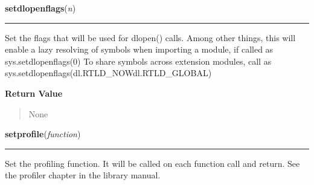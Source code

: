     \label{sys:setdlopenflags}

    \vspace{0.5ex}

\hspace{.8\funcindent}\begin{boxedminipage}{\funcwidth}

    \raggedright \textbf{setdlopenflags}(\textit{n})

    \vspace{-1.5ex}

    \rule{\textwidth}{0.5\fboxrule}
\setlength{\parskip}{2ex}
    Set the flags that will be used for dlopen() calls. Among other things,
    this will enable a lazy resolving of symbols when importing a module, 
    if called as sys.setdlopenflags(0) To share symbols across extension 
    modules, call as 
    sys.setdlopenflags(dl.RTLD\_NOW{\textbar}dl.RTLD\_GLOBAL)

\setlength{\parskip}{1ex}
      \textbf{Return Value}
    \vspace{-1ex}

      \begin{quote}
      None

      \end{quote}

    \end{boxedminipage}

    \label{sys:setprofile}

    \vspace{0.5ex}

\hspace{.8\funcindent}\begin{boxedminipage}{\funcwidth}

    \raggedright \textbf{setprofile}(\textit{function})

    \vspace{-1.5ex}

    \rule{\textwidth}{0.5\fboxrule}
\setlength{\parskip}{2ex}
    Set the profiling function.  It will be called on each function call 
    and return.  See the profiler chapter in the library manual.

\setlength{\parskip}{1ex}
    \end{boxedminipage}

    \label{sys:setrecursionlimit}

